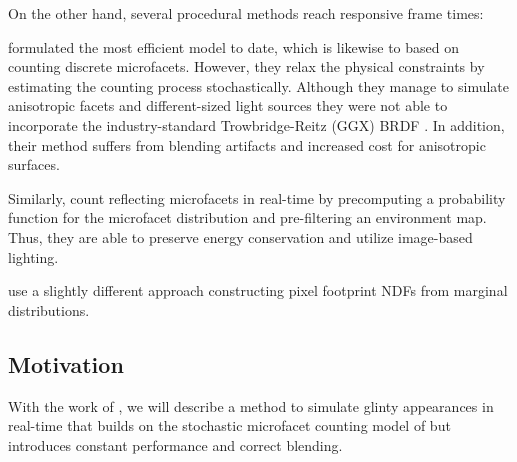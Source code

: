 On the other hand, several procedural methods reach responsive frame times:

\textcite{zirr2016} formulated the most efficient model to date, which is likewise to \textcite{jakob2014} based on counting discrete microfacets.
%
However, they relax the physical constraints by estimating the counting process stochastically.
%
Although they manage to simulate anisotropic facets and different-sized light sources they were not able to incorporate the industry-standard Trowbridge-Reitz (GGX) BRDF \parencite{trowbridge1975, walter2007}.
%
In addition, their method suffers from blending artifacts and increased cost for anisotropic surfaces.

Similarly, \textcite{wang2020} count reflecting microfacets in real-time by precomputing a probability function for the microfacet distribution and pre-filtering an environment map.
%
Thus, they are able to preserve energy conservation and utilize image-based lighting.

\textcite{chermain2020a} use a slightly different approach constructing pixel footprint NDFs from marginal distributions.

\subsection{Motivation}
\label{sec:motivation}

With the work of \textcite{deliot2023}, we will describe a method to simulate glinty appearances in real-time that builds on the stochastic microfacet counting model of \textcite{zirr2016} but introduces constant performance and correct blending.
